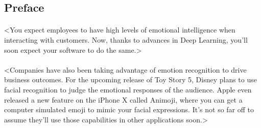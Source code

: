 \subsection{Preface}
\paragraph{}<You expect employees to have high levels of emotional intelligence when interacting with customers. Now, thanks to advances in Deep Learning, you’ll soon expect your software to do the same.>
\paragraph{}<Companies have also been taking advantage of emotion recognition to drive business outcomes. For the upcoming release of Toy Story 5, Disney plans to use facial recognition to judge the emotional responses of the audience. Apple even released a new feature on the iPhone X called Animoji, where you can get a computer simulated emoji to mimic your facial expressions. It’s not so far off to assume they’ll use those capabilities in other applications soon.>
